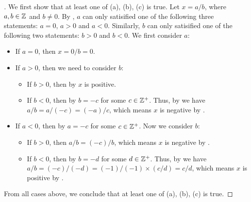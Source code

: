 \begin{proof}[]
  We first show that at least one of (a), (b), (c) is true.
  Let \(x = a / b\), where \(a, b \in \mathbb{Z}\) and \(b \neq 0\).
  By , \(a\) can only satisified one of the following three statements:
  \(a = 0\), \(a > 0\) and \(a < 0\).
  Similarly, \(b\) can only satisified one of the following two statements:
  \(b > 0\) and \(b < 0\).
  We first consider \(a\):
  \begin{itemize}
    \item If \(a = 0\), then \(x = 0 / b = 0\).
    \item If \(a > 0\), then we need to consider \(b\):
          \begin{itemize}
            \item If \(b > 0\), then by  \(x\) is positive.
            \item If \(b < 0\), then by  \(b = -c\) for some \(c \in \mathbb{Z}^+\).
                  Thus, by  we have \(a / b = a / (-c) = (-a) / c\), which means \(x\) is negative by .
          \end{itemize}
    \item If \(a < 0\), then by  \(a = -c\) for some \(c \in \mathbb{Z}^+\).
          Now we consider \(b\):
          \begin{itemize}
            \item If \(b > 0\), then \(a / b = (-c) / b\), which means \(x\) is negative by .
            \item If \(b < 0\), then by  \(b = -d\) for some \(d \in \mathbb{Z}^+\).
                  Thus, by  we have \(a / b = (-c) / (-d) = (-1) / (-1) \times (c / d) = c / d\), which means \(x\) is positive by .
          \end{itemize}
  \end{itemize}
  From all cases above, we conclude that at least one of (a), (b), (c) is true.


\end{proof}
